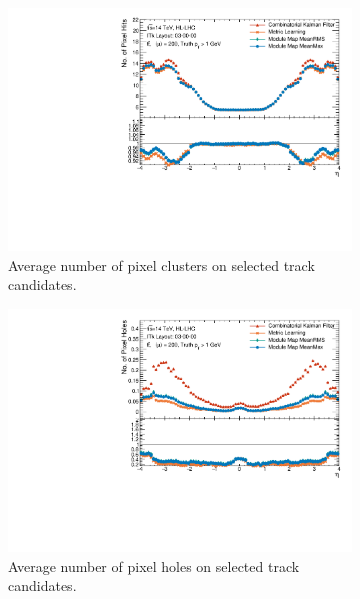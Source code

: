 \begin{figure}[h!]
\centering
\begin{subfigure}[b]{0.49\textwidth}
    \centering
    \includegraphics[width=\textwidth]{figures/ckf-gnn/HitsOnTracks/nPixelHits_vs_eta.pdf}
    \caption{Average number of pixel clusters on selected track candidates.}
    \label{subfig:n-pix-hits}
\end{subfigure}
\begin{subfigure}[b]{0.49\textwidth}
    \centering
    \includegraphics[width=\textwidth]{figures/ckf-gnn/HitsOnTracks/nPixelHoles_vs_eta.pdf}
    \caption{Average number of pixel holes on selected track candidates.}
    \label{subfig:n-pix-holes}
\end{subfigure}
\begin{subfigure}[b]{0.49\textwidth}

\end{subfigure}
\end{figure}
